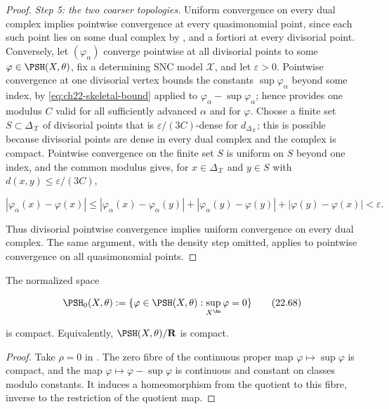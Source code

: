 \begin{proof}
\emph{Step 5: the two coarser topologies.}  Uniform convergence on every
dual complex implies pointwise convergence at every quasimonomial point,
since each such point lies on some dual complex by
, and a fortiori at every divisorial point.
Conversely, let $(\varphi_\alpha)$ converge pointwise at all divisorial
points to some $\varphi\in\PSH(X,\theta)$, fix a determining SNC model
$\mathcal X$, and let $\varepsilon>0$.  Pointwise convergence at one
divisorial vertex bounds the constants $\sup\varphi_\alpha$ beyond some
index, by \eqref{eq:ch22-skeletal-bound} applied to
$\varphi_\alpha-\sup\varphi_\alpha$; hence
 provides one modulus $C$ valid for all
sufficiently advanced $\alpha$ and for $\varphi$.  Choose a finite set
$S\subset\Delta_{\mathcal X}$ of divisorial points that is
$\varepsilon/(3C)$-dense for $d_{\Delta_{\mathcal X}}$; this is possible
because divisorial points are dense in every dual complex and the complex is
compact.  Pointwise convergence on the finite set $S$ is uniform on
$S$ beyond one index, and the common modulus gives, for
$x\in\Delta_{\mathcal X}$ and $y\in S$ with
$d(x,y)\leq\varepsilon/(3C)$,

\[
 |\varphi_\alpha(x)-\varphi(x)|
 \leq|\varphi_\alpha(x)-\varphi_\alpha(y)|
   +|\varphi_\alpha(y)-\varphi(y)|
   +|\varphi(y)-\varphi(x)|
 <\varepsilon .
\]

Thus divisorial pointwise convergence implies uniform convergence on every
dual complex.  The same argument, with the density step omitted, applies to
pointwise convergence on all quasimonomial points.
\end{proof}

\begin{theorem}\label{thm:bfj-psh-compactness}
The normalized space

\[
 \PSH_0(X,\theta)
 :=\{\varphi\in\PSH(X,\theta):
                    \sup_{X^{\An}}\varphi=0\}
\tag{22.68}\label{eq:ch22-normalized-space}
\]

is compact.  Equivalently, $\PSH(X,\theta)/\mathbf R$ is compact.
\end{theorem}

\begin{proof}
Take $\rho=0$ in .  The zero fibre of
the continuous proper map $\varphi\mapsto\sup\varphi$ is compact, and
the map $\varphi\mapsto\varphi-\sup\varphi$ is continuous and constant
on classes modulo constants.  It induces a homeomorphism from the quotient
to this fibre, inverse to the restriction of the quotient map.
\end{proof}

